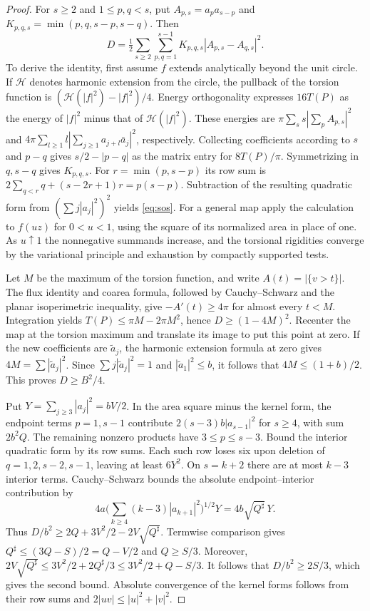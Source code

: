 \documentclass[11pt,a4paper,reqno]{amsart}
\theoremstyle{remark}
\numberwithin{equation}{section}
\begin{document}
\begin{proof}
For $s\ge2$ and $1\le p,q<s$, put $A_{p,s}=a_p a_{s-p}$ and
$K_{p,q,s}=\min(p,q,s-p,s-q)$. Then
\begin{equation}\label{eq:sos}
 D=\tfrac12\sum_{s\ge2}\sum_{p,q=1}^{s-1}K_{p,q,s}|A_{p,s}-A_{q,s}|^2 .
\end{equation}
To derive the identity, first assume $f$ extends analytically beyond the
unit circle. If $\mathcal H$ denotes harmonic extension from the circle,
the pullback of the torsion function is $(\mathcal H(|f|^2)-|f|^2)/4$.
Energy orthogonality expresses $16T(P)$ as the energy of $|f|^2$ minus
that of $\mathcal H(|f|^2)$. These energies are
$\pi\sum_s s|\sum_p A_{p,s}|^2$ and
$4\pi\sum_{l\ge1}l|\sum_{j\ge1}a_{j+l}\bar a_j|^2$, respectively.
Collecting coefficients according to $s$ and $p-q$ gives $s/2-|p-q|$ as
the matrix entry for $8T(P)/\pi$. Symmetrizing in $q,s-q$ gives $K_{p,q,s}$.
For $r=\min(p,s-p)$ its row sum is
$2\sum_{q<r}q+(s-2r+1)r=p(s-p)$. Subtraction of the resulting quadratic
form from $(\sum j|a_j|^2)^2$ yields \eqref{eq:sos}. For a general map
apply the calculation to $f(uz)$ for $0<u<1$, using the square of its
normalized area in place of one. As $u\uparrow1$ the nonnegative summands
increase, and the torsional rigidities converge by the variational principle
and exhaustion by compactly supported tests.

Let $M$ be the maximum of the torsion function, and write $A(t)=|\{v>t\}|$.
The flux identity and coarea formula, followed by Cauchy--Schwarz and the
planar isoperimetric inequality, give $-A'(t)\ge4\pi$ for almost every
$t<M$. Integration yields $T(P)\le\pi M-2\pi M^2$, hence
$D\ge(1-4M)^2$. Recenter the map at the torsion maximum and translate its
image to put this point at zero. If the new coefficients are $\tilde a_j$,
the harmonic extension formula at zero gives $4M=\sum|\tilde a_j|^2$.
Since $\sum j|\tilde a_j|^2=1$ and $|\tilde a_1|^2\le b$, it follows that
$4M\le(1+b)/2$. This proves $D\ge B^2/4$.

Put $Y=\sum_{j\ge3}|a_j|^2=bV/2$. In the area square minus the kernel form,
the endpoint terms $p=1,s-1$ contribute $2(s-3)b|a_{s-1}|^2$ for $s\ge4$,
with sum $2b^2Q$. The remaining nonzero products have $3\le p\le s-3$.
Bound the interior quadratic form by its row sums. Each such row loses
six upon deletion of $q=1,2,s-2,s-1$, leaving at least $6Y^2$.
On $s=k+2$ there are at most $k-3$ interior terms. Cauchy--Schwarz bounds
the absolute endpoint--interior contribution by
\[
 4a\Big(\sum_{k\ge4}(k-3)|a_{k+1}|^2\Big)^{1/2}Y
 =4b\sqrt{Q^\sharp}\,Y .
\]
Thus $D/b^2\ge2Q+3V^2/2-2V\sqrt{Q^\sharp}$. Termwise comparison gives
$Q^\sharp\le(3Q-S)/2=Q-V/2$ and $Q\ge S/3$. Moreover,
$2V\sqrt{Q^\sharp}\le3V^2/2+2Q^\sharp/3\le3V^2/2+Q-S/3$.
It follows that $D/b^2\ge2S/3$, which gives the second bound. Absolute
convergence of the kernel forms follows from their row sums and
$2|uv|\le|u|^2+|v|^2$.
\end{proof}
\end{document}

